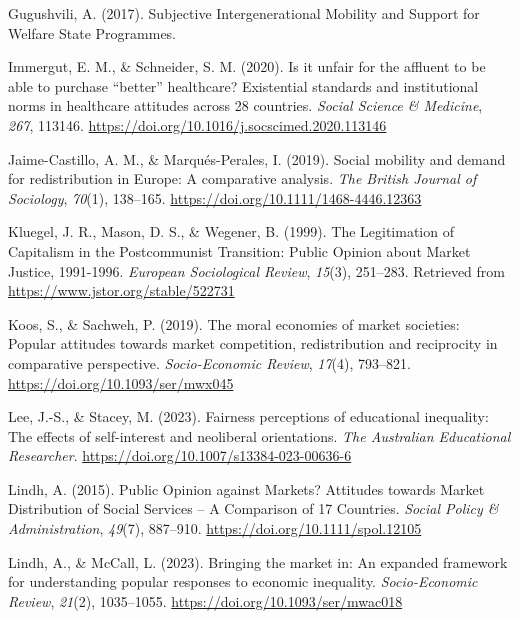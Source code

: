 \documentclass[
  12pt,
]{article}
\newlength{\cslhangindent}
\newenvironment{CSLReferences}[2] %
 {\begin{list}{}{%
  \setlength{\itemindent}{0pt}
  \setlength{\leftmargin}{0pt}
  \setlength{\parsep}{0pt}
  \ifodd #1
   \setlength{\leftmargin}{\cslhangindent}
   \setlength{\itemindent}{-1\cslhangindent}
  \fi
  \setlength{\itemsep}{#2\baselineskip}}}
 {\end{list}}
\begin{document}
\begin{CSLReferences}{1}{0}
Gugushvili, A. (2017). Subjective {Intergenerational Mobility} and
{Support} for {Welfare State Programmes}.

Immergut, E. M., \& Schneider, S. M. (2020). Is it unfair for the
affluent to be able to purchase {``better''} healthcare? {Existential}
standards and institutional norms in healthcare attitudes across 28
countries. \emph{Social Science \& Medicine}, \emph{267}, 113146.
\url{https://doi.org/10.1016/j.socscimed.2020.113146}

Jaime-Castillo, A. M., \& Marqués-Perales, I. (2019). Social mobility
and demand for redistribution in {Europe}: A comparative analysis.
\emph{The British Journal of Sociology}, \emph{70}(1), 138--165.
\url{https://doi.org/10.1111/1468-4446.12363}

Kluegel, J. R., Mason, D. S., \& Wegener, B. (1999). The {Legitimation}
of {Capitalism} in the {Postcommunist Transition}: {Public Opinion}
about {Market Justice}, 1991-1996. \emph{European Sociological Review},
\emph{15}(3), 251--283. Retrieved from
\url{https://www.jstor.org/stable/522731}

Koos, S., \& Sachweh, P. (2019). The moral economies of market
societies: Popular attitudes towards market competition, redistribution
and reciprocity in comparative perspective. \emph{Socio-Economic
Review}, \emph{17}(4), 793--821.
\url{https://doi.org/10.1093/ser/mwx045}

Lee, J.-S., \& Stacey, M. (2023). Fairness perceptions of educational
inequality: The effects of self-interest and neoliberal orientations.
\emph{The Australian Educational Researcher}.
\url{https://doi.org/10.1007/s13384-023-00636-6}

Lindh, A. (2015). Public {Opinion} against {Markets}? {Attitudes}
towards {Market Distribution} of {Social Services} -- {A Comparison} of
17 {Countries}. \emph{Social Policy \& Administration}, \emph{49}(7),
887--910. \url{https://doi.org/10.1111/spol.12105}

Lindh, A., \& McCall, L. (2023). Bringing the market in: An expanded
framework for understanding popular responses to economic inequality.
\emph{Socio-Economic Review}, \emph{21}(2), 1035--1055.
\url{https://doi.org/10.1093/ser/mwac018}


\end{CSLReferences}
\end{document}
